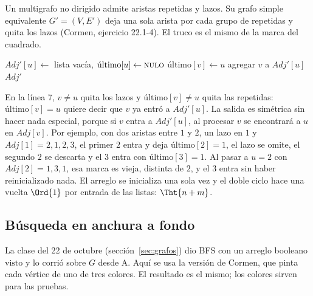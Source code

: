 \documentclass[11pt,letterpaper]{article}
\begin{document}
Un multigrafo no dirigido admite aristas repetidas y lazos. Su grafo
simple equivalente $G' = (V, E')$ deja una sola arista por cada grupo
de repetidas y quita los lazos (Cormen, ejercicio 22.1-4). El truco es
el mismo de la marca del cuadrado.

\begin{algorithm}[H]
\caption{\textsc{Simplificar-Multigrafo}$(G)$}
\label{alg:busq-simplificar}
\begin{algorithmic}[1]
    \State $\mathit{Adj}'[u] \gets$ lista vacía, \quad
           $\text{último}[u] \gets \textsc{nulo}$
  \EndFor
        \State $\text{último}[v] \gets u$
        \State agregar $v$ a $\mathit{Adj}'[u]$
      \EndIf
    \EndFor
  \EndFor
  \State \Return $\mathit{Adj}'$
\EndProcedure
\end{algorithmic}
\end{algorithm}

En la línea 7, $v \neq u$ quita los lazos y $\text{último}[v] \neq u$
quita las repetidas: $\text{último}[v] = u$ quiere decir que $v$ ya
entró a $\mathit{Adj}'[u]$. La salida es simétrica sin hacer nada
especial, porque si $v$ entra a $\mathit{Adj}'[u]$, al procesar $v$ se
encontrará a $u$ en $\mathit{Adj}[v]$. Por ejemplo, con dos aristas
entre $1$ y $2$, un lazo en $1$ y $\mathit{Adj}[1] = 2, 1, 2, 3$, el
primer $2$ entra y deja $\text{último}[2] = 1$, el lazo se omite, el
segundo $2$ se descarta y el $3$ entra con $\text{último}[3] = 1$.
Al pasar a $u = 2$ con $\mathit{Adj}[2] = 1, 3, 1$, esa marca es
vieja, distinta de $2$, y el $3$ entra sin haber reinicializado nada.
El arreglo se inicializa una sola vez y el doble ciclo hace una vuelta
$\Ord{1}$ por entrada de las listas: $\Tht{n + m}$.


\subsection*{Búsqueda en anchura a fondo}

La clase del 22 de octubre (sección~\ref{sec:grafos}) dio BFS con un
arreglo booleano $\text{visto}$ y lo corrió sobre $G$ desde A. Aquí se
usa la versión de Cormen, que pinta cada vértice de uno de tres
colores. El resultado es el mismo; los colores sirven para las
pruebas.
\end{document}
